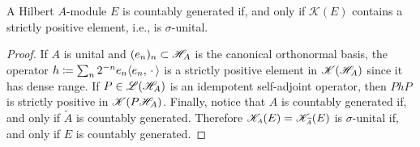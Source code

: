 \begin{proposicao}
    A Hilbert $A$-module $E$ is countably generated if, and only if $\mathscr K(E)$ contains a strictly positive element, i.e., is $\sigma$-unital.

    \begin{proof}
        If $A$ is unital and $(e_n)_n \subset \mathscr H_A$ is the canonical orthonormal basis, the operator $h \coloneqq \sum_n 2^{-n} e_n \langle {e_n},{\operatorname{\,\cdot\,}}\rangle$ is a strictly positive element in $\mathscr K(\mathscr H_A)$ since it has dense range. If $P\in \mathscr L(\mathscr H_A)$ is an idempotent self-adjoint operator, then $PhP$ is strictly positive in $\mathscr K(P\mathscr H_A)$. Finally, notice that $A$ is countably generated if, and only if $\widetilde{A}$ is countably generated. Therefore $\sub{\mathscr K}A(E) = \sub{\mathscr K}{\widetilde{A}}(E)$ is $\sigma$-unital if, and only if $E$ is countably generated.
    \end{proof}
\end{proposicao}




